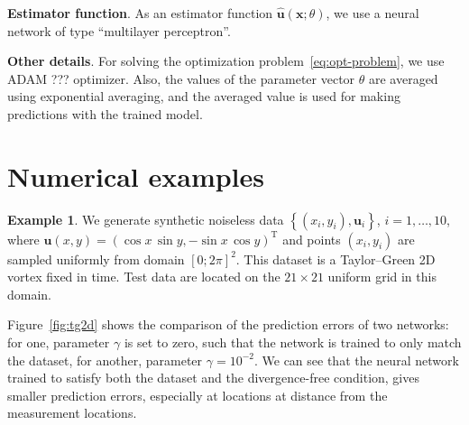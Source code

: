 \documentclass[pamm,a4paper,fleqn]{w-art}
\newcommand{\T}{\ensuremath{\text{T}}}
\renewcommand{\vec}[1]{\boldsymbol{#1}}
\begin{document}
\textbf{Estimator function}.
As an estimator function $\hat{\vec u}(\vec x; \theta)$, we use a neural network
of type ``multilayer perceptron''.

\textbf{Other details}.
For solving the optimization problem~\eqref{eq:opt-problem}, we use ADAM ???
optimizer.
Also, the values of the parameter vector $\theta$ are averaged using exponential
averaging, and the averaged value is used for making predictions with the
trained model.

\section{Numerical examples}

\textbf{Example 1}.
We generate synthetic noiseless data
  $\left\{(x_i, y_i), \vec{u}_i\right\}$, $i = 1, \dots, 10$,
where $\vec u(x, y) = ( \cos x \, \sin y, -\sin x \, \cos y)^\T$
and points $(x_i, y_i)$ are sampled uniformly from domain $[0; 2\pi]^2$.
This dataset is a Taylor--Green 2D vortex fixed in time.
Test data are located on the $21\times21$ uniform grid in this domain.

Figure~\ref{fig:tg2d} shows the comparison of the prediction errors of two
networks: for one, parameter $\gamma$ is set to zero, such that the network is
trained to only match the dataset, for another, parameter $\gamma = 10^{-2}$.
We can see that the neural network trained to satisfy both  the dataset and the
divergence-free condition, gives smaller prediction errors, especially at
locations at distance from the measurement locations.
\end{document}
